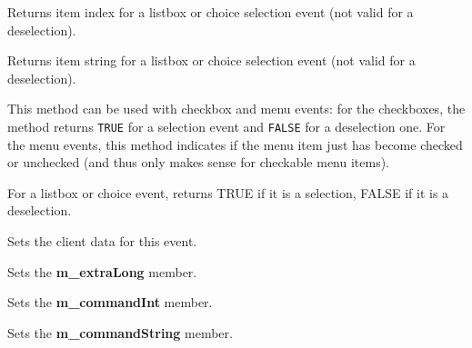 Returns item index for a listbox or choice selection event (not valid for
a deselection).



Returns item string for a listbox or choice selection event (not valid for
a deselection).

\label{wxcommandeventischecked}


This method can be used with checkbox and menu events: for the checkboxes, the
method returns {\tt TRUE} for a selection event and {\tt FALSE} for a
deselection one. For the menu events, this method indicates if the menu item
just has become checked or unchecked (and thus only makes sense for checkable
menu items).



For a listbox or choice event, returns TRUE if it is a selection, FALSE if it
is a deselection.



Sets the client data for this event.



Sets the {\bf m\_extraLong} member.



Sets the {\bf m\_commandInt} member.



Sets the {\bf m\_commandString} member.

